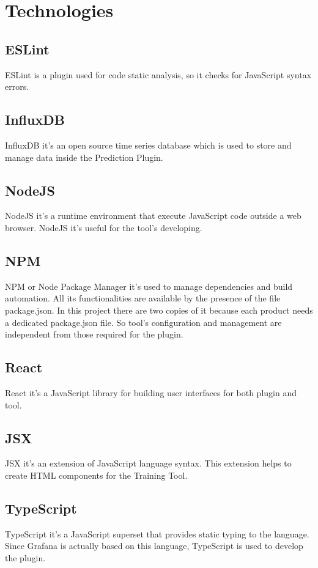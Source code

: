 \section{Technologies}
\subsection{ESLint}
ESLint is a plugin used for code static analysis, so it checks for JavaScript syntax errors.

\subsection{InfluxDB}
InfluxDB it's an open source time series database which is used to store and manage data inside the Prediction Plugin. 

\subsection{NodeJS}
NodeJS it's a runtime environment that execute JavaScript code outside a web browser. NodeJS it's useful for the tool's developing.

\subsection{NPM}
NPM or Node Package Manager it's used to manage dependencies and build automation. All its functionalities are available by the presence of the file package.json. In this project there are two copies of it because each product needs a dedicated package.json file. So tool's configuration and management are independent from those required for the plugin.

\subsection{React}
React it's a JavaScript library for building user interfaces for both plugin and tool.

\subsection{JSX}
JSX it's an extension of JavaScript language syntax. This extension helps to create HTML components for the Training Tool.

\subsection{TypeScript}
TypeScript it's a JavaScript superset that provides static typing to the language. Since Grafana is actually based on this language, TypeScript is used to develop the plugin.

